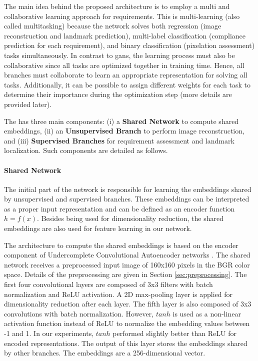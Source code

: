The main idea behind the proposed architecture is to employ a multi and collaborative learning approach for \icao requirements. This is multi-learning (also called multitasking) because the network solves both regression (image reconstruction and landmark prediction), multi-label classification (compliance prediction for each requirement), and binary classification (pixelation assessment) tasks simultaneously. In contrast to \acfp{gan}, the learning process must also be collaborative since all tasks are optimized together in training time. Hence, all branches must collaborate to learn an appropriate representation for solving all tasks. Additionally, it can be possible to assign different weights for each task to determine their importance during the optimization step (more details are provided later).
 
The \methodname has three main components: (i) a \textbf{Shared Network} to compute shared embeddings, (ii) an \textbf{Unsupervised Branch} to perform image reconstruction, and (iii) \textbf{Supervised Branches} for requirement assessment and landmark localization. Such components are detailed as follows.
 
\paragraph{Shared Network}
 
The initial part of the network is responsible for learning the embeddings shared by unsupervised and supervised branches. These embeddings can be interpreted as a proper input representation and can be defined as an encoder function $h = f(x)$. Besides being used for dimensionality reduction, the shared embeddings are also used for feature learning in our network.
 
The architecture to compute the shared embeddings is based on the encoder component of Undercomplete Convolutional Autoencoder networks \citep[p.~500]{goodfellow2016deep}. The shared network receives a preprocessed input image of 160x160 pixels in the BGR color space. Details of the preprocessing are given in Section \ref{sec:preprocessing}. The first four convolutional layers are composed of 3x3 filters with batch normalization and ReLU activation. A 2D max-pooling layer is applied for dimensionality reduction after each layer. The fifth layer is also composed of 3x3 convolutions with batch normalization. However, $tanh$ is used as a non-linear activation function instead of ReLU to normalize the embedding values between -1 and 1. In our experiments, $tanh$ performed slightly better than ReLU for encoded representations. The output of this layer stores the embeddings shared by other branches. The embeddings are a 256-dimensional vector.
 
